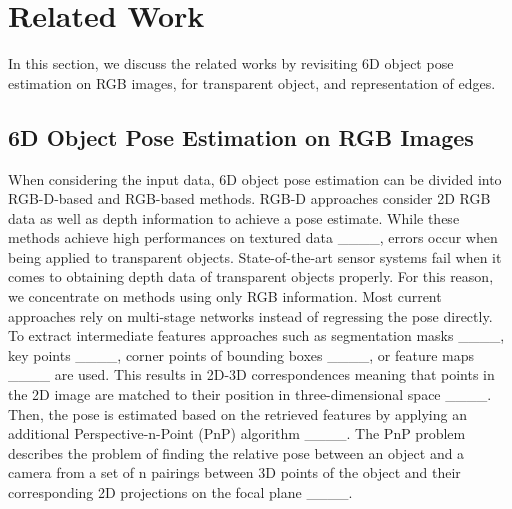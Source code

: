 \section{Related Work}
\vspace{-3mm}
In this section, we discuss the related works by revisiting 6D object pose estimation on RGB images, for transparent object, and representation of edges.

\subsection{6D Object Pose Estimation on RGB Images}
When considering the input data, 6D object pose estimation can be divided into RGB-D-based and RGB-based methods.
RGB-D approaches consider 2D RGB data as well as depth information to achieve a pose estimate. 
While these methods achieve high performances on textured data ____, errors occur when being applied to transparent objects. 
State-of-the-art sensor systems fail when it comes to obtaining depth data of transparent objects properly. For this reason, we concentrate on methods using only RGB information.
Most current approaches rely on multi-stage networks instead of regressing the pose directly.
To extract intermediate features approaches such as segmentation masks ____, key points ____, corner points of bounding boxes ____, or feature maps ____ are used. This results in 2D-3D correspondences meaning that points in the 2D image are matched to their position in three-dimensional space ____.
Then, the pose is estimated based on the retrieved features by applying an additional Perspective-n-Point (PnP) algorithm ____. The PnP problem describes the problem of finding the relative pose between an object and a camera from a set of n pairings between 3D points of the object and their corresponding 2D projections on the focal plane ____. 


